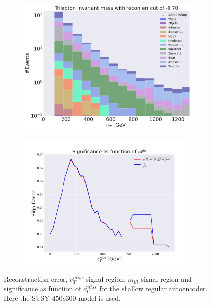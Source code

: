 \begin{figure}[H]
    \hfill
    \begin{subfigure}{.49\textwidth}
        \includegraphics[width=\textwidth]{Figures/AE_testing/small/3lep/b_data_recon_big_rm3_feats_sig_800p0p050p_mlll_recon_errcut_-0.70.pdf}
        \caption{}
        \label{fig:AE_3lep_small_mlll_800_3}
    \end{subfigure}
    \hfill   
    \begin{subfigure}{.49\textwidth}
        \includegraphics[width=\textwidth]{Figures/AE_testing/small/3lep/significance_etmiss_800p0p050p_-0.7044693201264449.pdf}
        \caption{}
        \label{fig:AE_3lep_small_signi_800_3}
    \end{subfigure}
    \hfill      
    \caption[3lep shallow network | $800p50$ | AE | 3]{Reconstruction error, $e_T^{miss}$ signal region, $m_{lll}$ signal region and significance as function of 
    $e_T^{miss}$ for the shallow regular autoencoder. Here the SUSY $450p300$ model is used.}
    \label{fig:AE_3lep_small_rec_sig_signi_800_3}
\end{figure}


